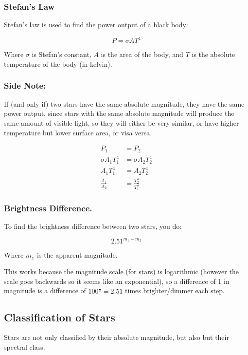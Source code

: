 \documentclass[a4paper, 12pt]{article}
\begin{document}
\subsubsection{Stefan's Law}

Stefan's law is used to find the power output of a black body:

$$
P = {\sigma}AT^4
$$

Where $\sigma$ is Stefan's constant, $A$ is the area of the body, and $T$ is the absolute temperature of the body (in kelvin).

\subsubsection{Side Note:}

If (and only if) two stars have the same absolute magnitude, they have the same power output, since stars with the same absolute magnitude will produce the same amount of visible light, so they will either be very similar, or have higher temperature but lower surface area, or visa versa.

\begin{align*}
P_1 &= P_2 \\
\sigma A_1 T^4_1 &= \sigma A_2 T^4_2 \\
A_1 T^4_1 &= A_2 T^4_2 \\
\frac{A_1}{A_2} &= \frac{T^4_2}{T^4_1}
\end{align*}

\subsubsection{Brightness Difference.}

To find the brightness difference between two stars, you do:

$$
2.51^{m_1 - m_2}
$$

Where $m_x$ is the apparent magnitude.

This works because the magnitude scale (for stars) is logarithmic (however the scale goes backwards so it seems like an exponential), so a difference of 1 in magnitude is a difference of $100^{\frac{1}{5}} = 2.51$ times brighter/dimmer each step.

\subsection{Classification of Stars}

Stars are not only classified by their absolute magnitude, but also but their spectral class.
\end{document}
